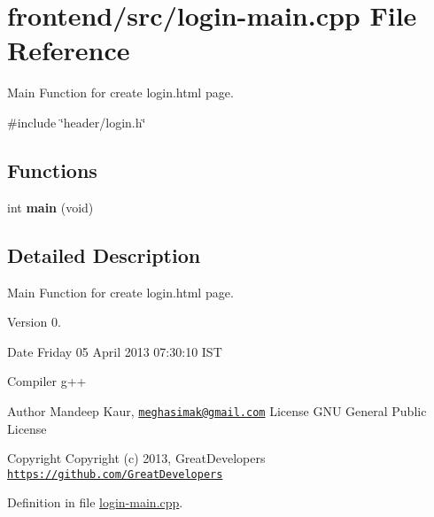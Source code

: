 \hypertarget{login-main_8cpp}{\section{frontend/src/login-\/main.cpp \-File \-Reference}
\label{login-main_8cpp}
}


\-Main \-Function for create login.\-html page.  


{\ttfamily \#include \char`\"{}header/login.\-h\char`\"{}}\*
\subsection*{\-Functions}
\begin{DoxyCompactItemize}
\item 
\hypertarget{login-main_8cpp_a840291bc02cba5474a4cb46a9b9566fe}{int {\bfseries main} (void)}\label{login-main_8cpp_a840291bc02cba5474a4cb46a9b9566fe}

\end{DoxyCompactItemize}


\subsection{\-Detailed \-Description}
\-Main \-Function for create login.\-html page. \begin{DoxyVersion}{\-Version}
0. 
\end{DoxyVersion}
\begin{DoxyDate}{\-Date}
\-Friday 05 \-April 2013 07\-:30\-:10 \-I\-S\-T\par
 \-Compiler g++
\end{DoxyDate}
\begin{DoxyAuthor}{\-Author}
\-Mandeep \-Kaur, \href{mailto:meghasimak@gmail.com}{\tt meghasimak@gmail.\-com} \-License \-G\-N\-U \-General \-Public \-License 
\end{DoxyAuthor}
\begin{DoxyCopyright}{\-Copyright}
\-Copyright (c) 2013, \-Great\-Developers \href{https://github.com/GreatDevelopers}{\tt https\-://github.\-com/\-Great\-Developers} 
\end{DoxyCopyright}


\-Definition in file \hyperlink{login-main_8cpp_source}{login-\/main.\-cpp}.

